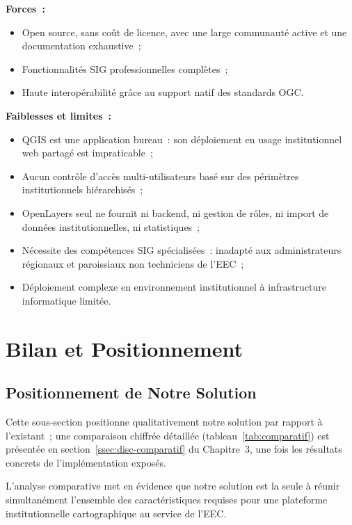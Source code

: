 \documentclass[12pt, a4paper]{report}
\begin{document}
\noindent\textbf{Forces~:}
\begin{itemize}[itemsep=2pt, topsep=4pt, leftmargin=1.5cm]
  \item Open source, sans coût de licence, avec une large communauté active et
    une documentation exhaustive~;
  \item Fonctionnalités SIG professionnelles complètes~;
  \item Haute interopérabilité grâce au support natif des standards OGC.
\end{itemize}

\noindent\textbf{Faiblesses et limites~:}
\begin{itemize}[itemsep=2pt, topsep=4pt, leftmargin=1.5cm]
  \item QGIS est une application bureau~: son déploiement en usage institutionnel
    web partagé est impraticable~;
  \item Aucun contrôle d'accès multi-utilisateurs basé sur des périmètres
    institutionnels hiérarchisés~;
  \item OpenLayers seul ne fournit ni backend, ni gestion de rôles, ni import de
    données institutionnelles, ni statistiques~;
  \item Nécessite des compétences SIG spécialisées~: inadapté aux administrateurs
    régionaux et paroissiaux non techniciens de l'EEC~;
  \item Déploiement complexe en environnement institutionnel à infrastructure
    informatique limitée.
\end{itemize}

\section{Bilan et Positionnement}
\label{sec:bilan}

\subsection{Positionnement de Notre Solution}

Cette sous-section positionne qualitativement notre solution par rapport à
l'existant~; une comparaison chiffrée détaillée (tableau~\ref{tab:comparatif})
est présentée en section~\ref{ssec:disc-comparatif} du Chapitre~3, une fois les
résultats concrets de l'implémentation exposés.

L'analyse comparative met en évidence que notre solution est la seule à réunir
simultanément l'ensemble des caractéristiques requises pour une plateforme
institutionnelle cartographique au service de l'EEC.
\end{document}
